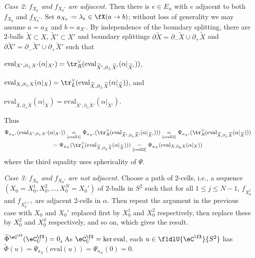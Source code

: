 \documentclass[12pt,reqno]{amsart}
\newcounter{alpha}\renewcommand\thealpha{\upshape\Alph{alpha}}
\newcommand{\eval}{\mathrm{eval}}
\newcommand{\psn}{\Phi}
\newcommand{\C}{\eC}
\newcommand{\tld}[1]{{\widetilde{#1}}}
\newcommand{\itemstep}[1]{\smallskip\noindent\underline{#1}}
\DeclareRobustCommand{\coloneq}{\mathrel{\vcenter{\baselineskip0.5ex\lineskiplimit0pt\hbox{\scriptsize{\upshape.}}\hbox{\scriptsize{\upshape.}}}}=}
\newcommand{\lU}[1]{#1_U}
\begin{document}
\begin{pf}
\emph{Case 2: $f_{X_0}$ and $f_{X_0'}$ are adjacent.} Then there is $e\in E_\alpha$ with $e$ adjacent to both $f_{X_0}$ and $f_{X_0'}$. Set $a_{X_0}\coloneq\lambda_e\in\fX(a\to b)$; without loss of generality we may assume $a=a_X$ and $b=a_{X'}$. By independence of the boundary splitting, there are 2-balls $\tld X\subset X$, $\tld X'\subset X'$ and boundary splittings $\partial\tld X=\partial_-\tld X\cup\partial_+\tld X$ and $\partial\tld X'=\partial_-\tld X'\cup\partial_+\tld X'$ such that
\begin{lst}
  \item\label{evall1} $\eval_{X',\partial_\pm X'}(\alpha|_{X'})=\tr_R^\vee(\eval_{\tld X',\partial_\pm\tld X'}(\alpha|_{\tld X'}))$,
  \item\label{evall2} $\eval_{X,\partial_\pm X}(\alpha|_X)=\tr_L^\vee(\eval_{\tld X,\partial_\pm\tld X}(\alpha|_{\tld X}))$, and
  \item\label{evall3} $\eval_{\tld X,\partial_\pm\tld X}(\alpha|_{\tld X})=\eval_{\tld X',\partial_\pm\tld X'}(\alpha|_{\tld X'})$.
\end{lst}
Thus
\begin{multline*}
  \Psi_{a_{X'}}(\eval_{X',\partial_\pm X'}(\alpha|_{X'}))
  \underset{\text{\ref{evall1}}}{=}\Psi_{a_{X'}}(\tr_R^\vee(\eval_{\tld X',\partial_\pm\tld X'}(\alpha|_{\tld X'})))
  \underset{\text{\ref{evall3}}}{=}\Psi_{a_{X'}}(\tr_R^\vee(\eval_{\tld X,\partial_\pm\tld X}(\alpha|_{\tld X})))\\
  =\Psi_{a_X}(\tr_L^\vee(\eval_{\tld X,\partial_\pm\tld X}(\alpha|_{\tld X})))
  \underset{\text{\ref{evall2}}}{=}\Psi_{a_X}(\eval_{X,\partial_\pm X}(\alpha|_X))
\end{multline*}
where the third equality uses sphericality of $\Psi$.

\emph{Case 3: $f_{X_0}$ and $f_{X_0'}$ are not adjacent.} 
Choose a path of 2-cells, i.e., a sequence $(X_0=X_0^1,X_0^2,\dots,X_0^N=X_0')$ of $2$-balls in $S^2$ such that for all $1\leq j\leq N-1$, $f_{X_0^j}$ and $f_{X_0^{j+1}}$ are adjacent $2$-cells in $\alpha$. Then repeat the argument in the previous case with $X_0$ and $X_0'$ replaced first by $X_0^1$ and $X_0^2$ respectively, then replace these by $X_0^2$ and $X_0^3$ respectively, and so on, which gives the result.




\itemstep{$\tld\psn^{\C^\fX}(\lU{\C^\fX})=0$.}
As $\lU{\C^\fX}=\ker\eval$, each $u\in\fldlU{\C^\fX}{S^2}$ has $\tld\psn(u)=\Psi_{a_X}(\eval(u))=\Psi_{a_X}(0)=0$.


\end{pf}
\end{document}
